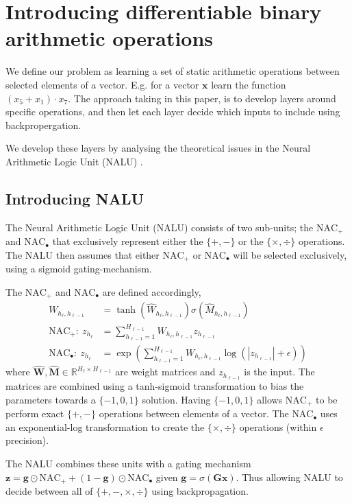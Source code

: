 \section{Introducing differentiable binary arithmetic operations}
\label{sec:Nalu}
We define our problem as learning a set of static arithmetic operations between selected elements of a vector. E.g. for a vector $\mathbf{x}$ learn the function ${(x_5 + x_1) \cdot x_7}$. The approach taking in this paper, is to develop layers around specific operations, and then let each layer decide which inputs to include using backpropergation.

We develop these layers by analysing the theoretical issues in the Neural Arithmetic Logic Unit (NALU) \cite{trask-nalu}.

\subsection{Introducing NALU}
The Neural Arithmetic Logic Unit (NALU) consists of two sub-units; the $\text{NAC}_{+}$ and $\text{NAC}_{\bullet}$ that exclusively represent either the $\{+, -\}$ or the $\{\times, \div \}$ operations. The NALU then assumes that either $\text{NAC}_{+}$ or $\text{NAC}_{\bullet}$ will be selected exclusively, using a sigmoid gating-mechanism.

The $\text{NAC}_{+}$ and $\text{NAC}_{\bullet}$ are defined accordingly,
\begin{align}
W_{h_\ell, h_{\ell-1}} &= \tanh(\hat{W}_{h_\ell, h_{\ell-1}}) \sigma(\hat{M}_{h_\ell, h_{\ell-1}}) \label{eq:weight}\\
\textrm{NAC}_+:\ z_{h_\ell} &= \sum_{h_{\ell-1}=1}^{H_{\ell-1}} W_{h_{\ell}, h_{\ell-1}} z_{h_{\ell-1}} \label{eq:naca}\\
\textrm{NAC}_\bullet:\ z_{h_\ell} &= \exp\left(\sum_{h_{\ell-1}=1}^{H_{\ell-1}} W_{h_{\ell}, h_{\ell-1}} \label{eq:nacm}\log(|z_{h_{\ell-1}}| + \epsilon) \right)
\end{align}
where $\hat{\mathbf{W}}, \hat{\mathbf{M}} \in \mathbb{R}^{H_{\ell} \times H_{\ell-1}}$ are weight matrices and $z_{h_{\ell-1}}$ is the input. The matrices are combined using a tanh-sigmoid transformation to bias the parameters towards a $\{-1,0,1\}$ solution. Having $\{-1,0,1\}$ allows $\text{NAC}_{+}$ to be perform exact $\{+, -\}$ operations between elements of a vector.
The $\text{NAC}_{\bullet}$ uses an exponential-log transformation to create the $\{\times, \div \}$ operations (within $\epsilon$ precision).

The NALU combines these units with a gating mechanism $\mathbf{z} = \mathbf{g} \odot \text{NAC}_{+} + (1 - \mathbf{g}) \odot \text{NAC}_{\bullet}$ given $\mathbf{g} = \sigma(\mathbf{G} \mathbf{x})$. Thus allowing NALU to decide between all of $\{+, -, \times, \div\}$ using backpropagation.

